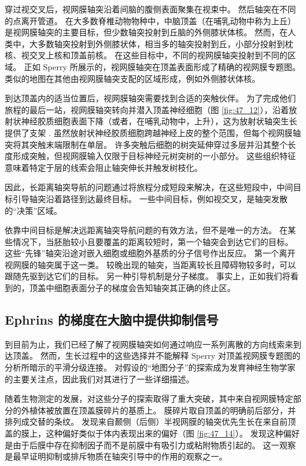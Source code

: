 穿过视交叉后，视网膜轴突沿着间脑的腹侧表面聚集在视束中。 然后轴突在不同的点离开管道。 在大多数脊椎动物物种中，中脑顶盖（在哺乳动物中称为上丘）是视网膜轴突的主要目标，但少数轴突投射到丘脑的外侧膝状体核。 然而，在人类中，大多数轴突投射到外侧膝状体，相当多的轴突投射到丘，小部分投射到枕核、视交叉上核和顶盖前核。 在这些目标中，不同的视网膜轴突投射到不同的区域。 正如 Sperry 所展示的，视网膜轴突在顶盖表面形成了精确的视网膜专题图。 类似的地图在其他由视网膜轴突支配的区域形成，例如外侧膝状体核。

到达顶盖内的适当位置后，视网膜轴突需要找到合适的突触伙伴。 为了完成他们旅程的最后一站，视网膜轴突转向并潜入顶盖神经细胞（图 \ref{fig:47_12}），沿着放射状神经胶质细胞表面下降（或者，在哺乳动物中，上升），这为放射状轴突生长提供了支架 . 虽然放射状神经胶质细胞跨越神经上皮的整个范围，但每个视网膜轴突将其突触末端限制在单层。 许多突触后细胞的树突延伸穿过多层并沿其整个长度形成突触，但视网膜输入仅限于目标神经元树突树的一小部分。 这些组织特征意味着特定于层的线索会阻止轴突伸长并触发树枝化。

因此，长距离轴突导航的问题通过将旅程分成短段来解决，在这些短段中，中间目标引导轴突沿着路径到达最终目标。 一些中间目标，例如视交叉，是轴突发散的“决策”区域。

依靠中间目标是解决远距离轴突导航问题的有效方法，但不是唯一的方法。 在某些情况下，当胚胎较小且要覆盖的距离较短时，第一个轴突会到达它们的目标。 这些“先锋”轴突沿途对嵌入细胞或细胞外基质的分子信号作出反应。 第一个离开视网膜的轴突属于这一类。 较晚出现的轴突，当距离较长且障碍物较多时，可以跟随先驱到达它们的目标。 另一种引导机制是分子梯度。 事实上，正如我们将看到的，顶盖中细胞表面分子的梯度会告知轴突其正确的终止区。

\subsection{Ephrins 的梯度在大脑中提供抑制信号}
到目前为止，我们已经了解了视网膜轴突如何通过响应一系列离散的方向线索来到达顶盖。 然而，生长过程中的这些选择并不能解释 Sperry 对顶盖视网膜专题图的分析所暗示的平滑分级连接。 对假设的“地图分子”的探索成为发育神经生物学家的主要关注点，因此我们对其进行了一些详细描述。

随着生物测定的发展，对这些分子的探索取得了重大突破，其中来自视网膜特定部分的外植体被放置在顶盖膜碎片的基质上。 膜碎片取自顶盖的明确前后部分，并排列成交替的条纹。 
发现来自颞侧（后侧）半视网膜的轴突优先生长在来自前顶盖的膜上，这种偏好类似于体内表现出来的偏好（图 \ref{fig:47_14}）。 
发现这种偏好是由于后膜中存在抑制因子而不是前膜中有吸引力或粘附物质引起的。 这一观察是最早证明抑制或排斥物质在轴突引导中的作用的观察之一。

